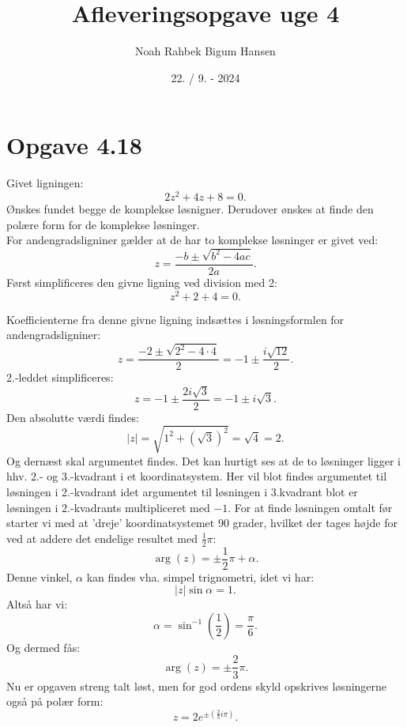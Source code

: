 \documentclass[12pt]{article}
\title{Afleveringsopgave uge 4}
\author{Noah Rahbek Bigum Hansen}
\date{22. / 9. - 2024}
\begin{document}
\maketitle

\section*{Opgave 4.18}

Givet ligningen:
\[
2z^2+4z+8=0
.\] 
Ønskes fundet begge de komplekse løsnigner. Derudover ønskes at finde den polære form for de komplekse løsninger. \\
For andengradsligniner gælder at de har to komplekse løsninger er givet ved:
	\[
		z = \frac{-b \pm \sqrt{b^2-4ac}}{2a} 
	.\] 
Først simplificeres den givne ligning ved division med 2:
		\[
		z^2+2+4=0
		.\] 

Koefficienterne fra denne givne ligning indsættes i løsningsformlen for andengradsligniner:
	\[
		z = \frac{-2 \pm \sqrt{2^2-4\cdot 4}}{2} = -1 \pm \frac{i\sqrt{12}}{2} 	.\] 
2.-leddet simplificeres:
	\[
	z = -1 \pm \frac{2i\sqrt{3}}{2} = -1 \pm i\sqrt{3} 
	.\]
Den absolutte værdi findes:
	\[
	|z| = \sqrt{1^2 + (\sqrt{3})^2} = \sqrt{4} = 2 
	.\] 
Og dernæst skal argumentet findes. Det kan hurtigt ses at de to løsninger ligger i hhv. 2.- og 3.-kvadrant i et koordinatsystem. Her vil blot findes argumentet til løsningen i 2.-kvadrant idet argumentet til løsningen i 3.kvadrant blot er løsningen i 2.-kvadrants multipliceret med $-1$. For at finde løsningen omtalt før starter vi med at 'dreje' koordinatsystemet 90 grader, hvilket der tages højde for ved at addere det endelige resultet med  $\frac{1}{2}\pi$:
	\[
	\arg(z) = \pm \frac{1}{2}\pi + \alpha
	.\] 
Denne vinkel, $\alpha$ kan findes vha. simpel trignometri, idet vi har:
	\[
		|z|\sin{\alpha} = 1
	.\] 
Altså har vi:
	\[
		\alpha = \sin^{-1}\left( \frac{1}{2} \right) = \frac{\pi}{6}
	.\] 
Og dermed fås:
	\[
	\arg(z) = \pm \frac{2}{3}\pi
	.\] 
Nu er opgaven streng talt løst, men for god ordens skyld opskrives løsningerne også på polær form:
	\[
	z = 2e^{\pm \left( \frac{2}{3} i \pi \right) }
	.\] 
\end{document}
